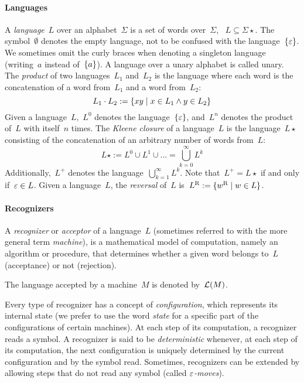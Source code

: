 \paragraph{Languages} A \emph{language}~$L$ over an alphabet~$\Sigma$ is a set of words over~$\Sigma$, \ie~$L\subseteq\Sigma\star$.
The symbol~$\emptyset$ denotes the empty language, not to be confused with the language~$\{\varepsilon\}$.
We sometimes omit the curly braces when denoting a singleton language (writing~$a$ instead of~$\{a\}$).
A language over a unary alphabet is called unary.
The \emph{product} of two languages~$L_1$ and~$L_2$ is the language where each word is the concatenation of a word from~$L_1$ and a word from~$L_2$: \begin{equation*} L_1\cdot L_2 := \{xy\mid x\in L_1 \land y\in L_2\} \end{equation*} Given a language~$L$,~$L^0$ denotes the language~$\{\varepsilon\}$, and~$L^n$ denotes the product of~$L$ with itself~$n$ times.
The \emph{Kleene closure} of a language~$L$ is the language~$L\star$ consisting of the concatenation of an arbitrary number of words from~$L$: \begin{equation*} L\star := L^0\cup L^1\cup\dots=\bigcup_{k=0}^\infty L^k \end{equation*} Additionally,~$L^+$ denotes the language~$\bigcup_{k=1}^\infty L^k$.
Note that~$L^+=L\star$ if and only if~$\varepsilon\in L$.
Given a language~$L$, the \emph{reversal} of~$L$ is~$L^{\mathrm R}:=\{w^{\mathrm R} \mid w\in L\}$.

\paragraph{Recognizers} A \emph{recognizer} or \emph{acceptor} of a language~$L$ (sometimes referred to with the more general term \emph{machine}), is a mathematical model of computation, namely an algorithm or procedure, that determines whether a given word belongs to~$L$ (acceptance) or not (rejection).

The language accepted by a machine~$M$ is denoted by~$\mathcal L(M)$.

Every type of recognizer has a concept of \emph{configuration}, which represents its internal state (we prefer to use the word \emph{state} for a specific part of the configurations of certain machines).
At each step of its computation, a recognizer reads a symbol.
A recognizer is said to be \emph{deterministic} whenever, at each step of its computation, the next configuration is uniquely determined by the current configuration and by the symbol read.
Sometimes, recognizers can be extended by allowing steps that do not read any symbol (called \emph{$\varepsilon$-moves}).



